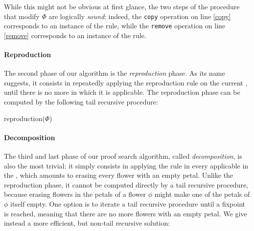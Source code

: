 \begin{scope}
While this might not be obvious at first glance, the two steps of the
 procedure that modify $\Phi$ are logically
\emph{sound}: indeed, the \texttt{copy} operation on line \ref{copy} corresponds
to an instance of the  rule, while the \texttt{remove} operation
on line \ref{remove} corresponds to an instance of the  rule.

\paragraph{Reproduction}

The second phase of our algorithm is the \emph{reproduction} phase. As its name
suggests, it consists in repeatedly applying the reproduction rule  on
the current , until there is no more  in which it is
applicable. The reproduction phase can be computed
by the following tail recursive procedure:

\begin{procedure}[H]
  \caption{reproduction($\Phi$)}
  \BlankLine

\end{procedure}

\paragraph{Decomposition}

The third and last phase of our proof search algorithm, called
\emph{decomposition}, is also the most trivial: it simply consists in applying
the  rule in every applicable  in the , which amounts to
erasing every flower with an empty petal. Unlike the reproduction phase, it cannot be
computed directly by a tail recursive procedure, because erasing flowers in the
petals of a flower $\phi$ might make one of the petals of $\phi$ itself empty.
One option is to iterate a tail recursive procedure until a fixpoint is reached,
meaning that there are no more flowers with an empty petal. We give instead a
more efficient, but non-tail recursive solution:


\end{scope}
